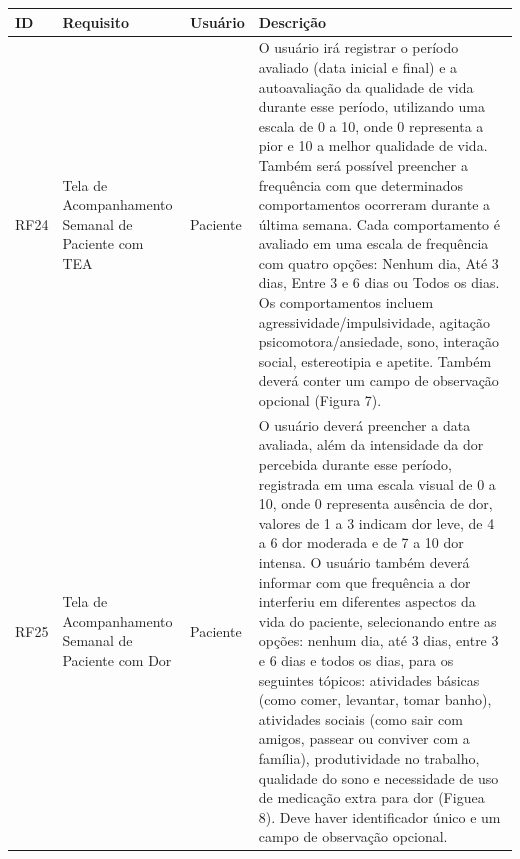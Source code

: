 \href{}{}\documentclass[12pt,portuguese,oneside]{article}
\begin{document}
\begin{table}[H]
\centering
{}
\begin{tabularx}{\textwidth}{|>{\raggedright\arraybackslash}p{1cm}|>{\raggedright\arraybackslash}p{3cm}|>{\raggedright\arraybackslash}p{2cm}|>{\raggedright\arraybackslash}X|}
\hline
\rowcolor{gray!20}
\textbf{ID} & \textbf{Requisito} & \textbf{Usuário} & \textbf{Descrição}\\
\hline
RF24 & Tela de Acompanhamento Semanal de Paciente com TEA & Paciente &
O usuário irá registrar o período avaliado (data inicial e final) e a autoavaliação da qualidade de vida durante esse período, utilizando uma escala de 0 a 10, onde 0 representa a pior e 10 a melhor qualidade de vida. Também será possível preencher a frequência com que determinados comportamentos ocorreram durante a última semana. Cada comportamento é avaliado em uma escala de frequência com quatro opções: Nenhum dia, Até 3 dias, Entre 3 e 6 dias ou Todos os dias. Os comportamentos incluem agressividade/impulsividade, agitação psicomotora/ansiedade, sono, interação social, estereotipia e apetite. Também deverá conter um campo de observação opcional (Figura 7).\\
\hline
RF25 & Tela de Acompanhamento Semanal de Paciente com Dor & Paciente & O usuário deverá preencher a data avaliada, além da intensidade da dor percebida durante esse período, registrada em uma escala visual de 0 a 10, onde 0 representa ausência de dor, valores de 1 a 3 indicam dor leve, de 4 a 6 dor moderada e de 7 a 10 dor intensa. O usuário também deverá informar com que frequência a dor interferiu em diferentes aspectos da vida do paciente, selecionando entre as opções: nenhum dia, até 3 dias, entre 3 e 6 dias e todos os dias, para os seguintes tópicos: atividades básicas (como comer, levantar, tomar banho), atividades sociais (como sair com amigos, passear ou conviver com a família), produtividade no trabalho, qualidade do sono e necessidade de uso de medicação extra para dor (Figuea 8). Deve haver identificador único e um campo de observação opcional.\\
\hline
\end{tabularx}
\end{table}

\newpage
\end{document}
